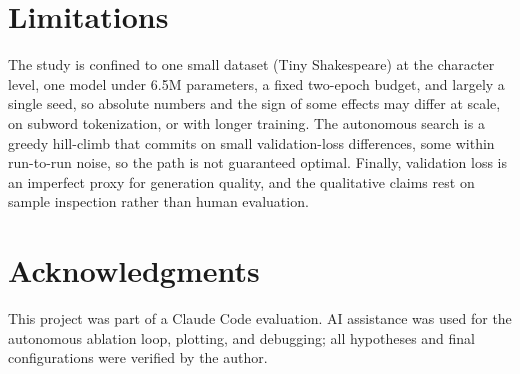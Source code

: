 \documentclass[11pt]{article}
\begin{document}
\section*{Limitations}

The study is confined to one small dataset (Tiny Shakespeare) at the character
level, one model under 6.5M parameters, a fixed two-epoch budget, and largely a
single seed, so absolute numbers and the sign of some effects may differ at
scale, on subword tokenization, or with longer training. The autonomous search
is a greedy hill-climb that commits on small validation-loss differences, some
within run-to-run noise, so the path is not guaranteed optimal. Finally,
validation loss is an imperfect proxy for generation quality, and the qualitative
claims rest on sample inspection rather than human evaluation.

\section*{Acknowledgments}

This project was part of a Claude Code evaluation. AI assistance was used for the
autonomous ablation loop, plotting, and debugging; all hypotheses and final
configurations were verified by the author.


\end{document}
